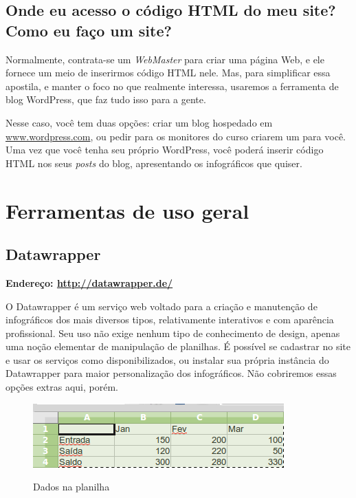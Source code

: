\documentclass[12pt,onecolumn]{article}
\begin{document}
  \subsection{Onde eu acesso o código HTML do meu site? Como eu faço um site?}
    Normalmente, contrata-se um \textit{WebMaster} para criar uma página Web, e
    ele fornece um meio de inserirmos código HTML nele. Mas, para simplificar
    essa apostila, e manter o foco no que realmente interessa, usaremos a
    ferramenta de blog WordPress, que faz tudo isso para a gente.
    
    Nesse caso, você tem duas opções: criar um blog hospedado em
    \url{www.wordpress.com}, ou pedir para os monitores do curso criarem um
    para você\footnotemark. Uma vez que você tenha seu próprio WordPress, você
    poderá inserir código HTML nos seus \textit{posts} do blog, apresentando os
    infográficos que quiser.
    

\clearpage
\section{Ferramentas de uso geral}
  \subsection{Datawrapper}
     \textbf{Endereço: \url{http://datawrapper.de/}}
    
    O Datawrapper é um serviço web voltado para a criação e manutenção de
    infográficos dos mais diversos tipos, relativamente interativos e com
    aparência profissional. Seu uso não exige nenhum tipo de conhecimento de
    design, apenas uma noção elementar de manipulação de planilhas. É possível
    se cadastrar no site e usar os serviços como disponibilizados, ou instalar
    sua própria instância do Datawrapper para maior personalização dos
    infográficos. Não cobriremos essas opções extras aqui, porém.
    
    \begin{figure}[H]
      \begin{center}
        \includegraphics[scale=0.5]{dados-calc.png}
        \label{fig:dados-calc}
        \caption{Dados na planilha}
      \end{center}
    \end{figure}
    
\end{document}
